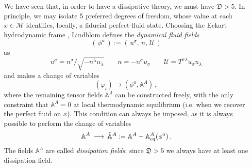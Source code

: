 \documentclass[a4paper, amsfonts, amssymb, amsmath, reprint, twocolumn, showkeys, nofootinbib]{revtex4-2}
\begin{document}
We have seen that, in order to have a dissipative theory, we must have $\mathfrak{D} >5$. In principle, we may  isolate 5 preferred degrees of freedom, whose value at each $x\in \mathcal{M}$ identifies, locally, a fiducial perfect-fluid state. 
Choosing the Eckart hydrodynamic frame \citep{Kovtun2019}, Lindblom defines the \textit{dynamical fluid fields}
\begin{equation}
(\, \phi^a \, ) := (\,u^\sigma, \,n , \, \mathcal{U} \, )
\end{equation}
as
\begin{equation}\label{proscrivuznz}
u^\sigma = n^\sigma /\sqrt{-n^\lambda n_\lambda}  
\qquad   n=-n^\sigma u_\sigma  
\qquad   \mathcal{U}=T^{\sigma \lambda} u_\sigma u_\lambda 
\end{equation}
and makes a change of variables 
\begin{equation}\label{LindblomReprentazionnze}
(\varphi_i) \longrightarrow (\phi^a,\mathbb{A}^A) \, ,
\end{equation}
where the remaining tensor fields $\mathbb{A}^A$ can be constructed freely, with the only constraint that $ \mathbb{A}^A=0 $ at local thermodynamic equilibrium (i.e. when we recover the perfect fluid on $x$). 
This condition can always be imposed, as it is always possible to perform the change of variables
\begin{equation}
\mathbb{A}^A \, \longrightarrow \, \Check{\mathbb{A}}^A := \mathbb{A}^A - \mathbb{A}^A_{\text{eq}}(\phi^a) \, .
\end{equation}
The fields $\mathbb{A}^A$ are called \textit{dissipation fields}; since $\mathfrak{D}>5$ we always have at least one dissipation field.
\end{document}
